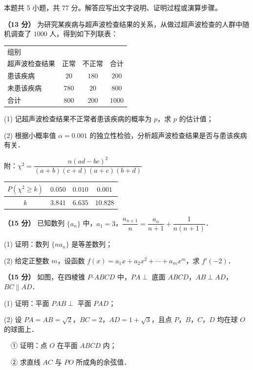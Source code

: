 \begin{gktip}
本题共 5 小题，共 77 分。解答应写出文字说明、证明过程或演算步骤。
\end{gktip}

\begin{question}
\textbf{（13 分）} 为研究某疾病与超声波检查结果的关系，从做过超声波检查的人群中随机调查了 $1000$ 人，得到如下列联表：

\begin{center}
\begin{tabular}{lccc}
\toprule
组别 \\ 超声波检查结果 & 正常 & 不正常 & 合计 \\
\midrule
患该疾病 & $20$ & $180$ & $200$ \\
未患该疾病 & $780$ & $20$ & $800$ \\
合计 & $800$ & $200$ & $1000$ \\
\bottomrule
\end{tabular}
\end{center}

  (1) 记超声波检查结果不正常者患该疾病的概率为 $p$，求 $p$ 的估计值；

  (2) 根据小概率值 $\alpha=0.001$ 的独立性检验，分析超声波检查结果是否与患该疾病有关．

  附：$\chi^2=\dfrac{n(ad-bc)^2}{(a+b)(c+d)(a+c)(b+d)}$

\begin{center}
\begin{tabular}{cccc}
\toprule
$P(\chi^2\ge k)$ & $0.050$ & $0.010$ & $0.001$ \\
\midrule
$k$ & $3.841$ & $6.635$ & $10.828$ \\
\bottomrule
\end{tabular}
\end{center}

\end{question}
\begin{question}
\textbf{（15 分）} 已知数列 $\{a_n\}$ 中，$a_1=3$，$\dfrac{a_{n+1}}{n}=\dfrac{a_n}{n+1}+\dfrac{1}{n(n+1)}$．

  (1) 证明：数列 $\{na_n\}$ 是等差数列；

  (2) 给定正整数 $m$，设函数 $f(x)=a_1x+a_2x^2+\cdots+a_mx^m$，求 $f'(-2)$．

\Needspace{0.4\textheight}
\end{question}
\begin{question}
\textbf{（15 分）} 如图，在四棱锥 $P\text{-}ABCD$ 中，$PA\perp$ 底面 $ABCD$，$AB\perp AD$，$BC\parallel AD$．
\nopagebreak[4]
\begin{center}\end{center}
\nopagebreak[4]
  (1) 证明：平面 $PAB\perp$ 平面 $PAD$；

  (2) 设 $PA=AB=\sqrt2$，$BC=2$，$AD=1+\sqrt3$，且点 $P$，$B$，$C$，$D$ 均在球 $O$ 的球面上．

  　① 证明：点 $O$ 在平面 $ABCD$ 内；

  　② 求直线 $AC$ 与 $PO$ 所成角的余弦值．

\end{question}
